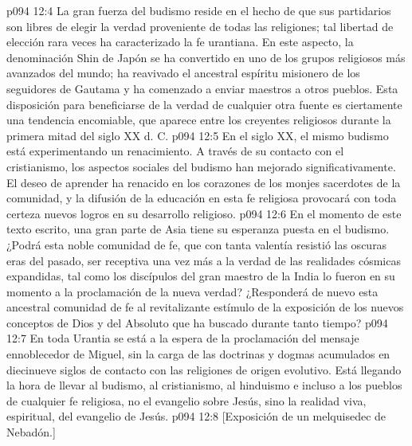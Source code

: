 \vs p094 12:4 La gran fuerza del budismo reside en el hecho de que sus partidarios son libres de elegir la verdad proveniente de todas las religiones; tal libertad de elección rara veces ha caracterizado la fe urantiana. En este aspecto, la denominación Shin de Japón se ha convertido en uno de los grupos religiosos más avanzados del mundo; ha reavivado el ancestral espíritu misionero de los seguidores de Gautama y ha comenzado a enviar maestros a otros pueblos. Esta disposición para beneficiarse de la verdad de cualquier otra fuente es ciertamente una tendencia encomiable, que aparece entre los creyentes religiosos durante la primera mitad del siglo XX d. C.
\vs p094 12:5 En el siglo XX, el mismo budismo está experimentando un renacimiento. A través de su contacto con el cristianismo, los aspectos sociales del budismo han mejorado significativamente. El deseo de aprender ha renacido en los corazones de los monjes sacerdotes de la comunidad, y la difusión de la educación en esta fe religiosa provocará con toda certeza nuevos logros en su desarrollo religioso.
\vs p094 12:6 En el momento de este texto escrito, una gran parte de Asia tiene su esperanza puesta en el budismo. ¿Podrá esta noble comunidad de fe, que con tanta valentía resistió las oscuras eras del pasado, ser receptiva una vez más a la verdad de las realidades cósmicas expandidas, tal como los discípulos del gran maestro de la India lo fueron en su momento a la proclamación de la nueva verdad? ¿Responderá de nuevo esta ancestral comunidad de fe al revitalizante estímulo de la exposición de los nuevos conceptos de Dios y del Absoluto que ha buscado durante tanto tiempo?
\vs p094 12:7 \pc En toda Urantia se está a la espera de la proclamación del mensaje ennoblecedor de Miguel, sin la carga de las doctrinas y dogmas acumulados en diecinueve siglos de contacto con las religiones de origen evolutivo. Está llegando la hora de llevar al budismo, al cristianismo, al hinduismo e incluso a los pueblos de cualquier fe religiosa, no el evangelio sobre Jesús, sino la realidad viva, espiritual, del evangelio de Jesús.
\vsetoff
\vs p094 12:8 [Exposición de un melquisedec de Nebadón.]
